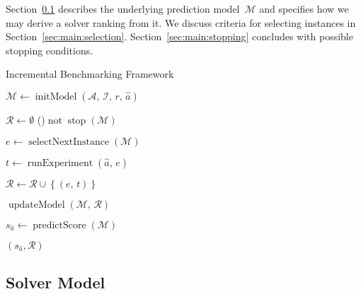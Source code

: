 \documentclass[runningheads]{llncs}
\begin{document}
Section~\ref{sec:main:model} describes the underlying prediction model~$\mathcal{M}$ and specifies how we may derive a solver ranking from it.
We discuss criteria for selecting instances in Section~\ref{sec:main:selection}.
Section~\ref{sec:main:stopping} concludes with possible stopping conditions.

\begin{algorithm}
  \caption{Incremental Benchmarking Framework}
  \label{algALBenchmark}


  \BlankLine

  $\mathcal{M} \leftarrow \operatorname{initModel}\left(\mathcal{A},\, \mathcal{I},\, r,\, \hat{a}\right)$ 
  
  \BlankLine
  $\mathcal{R} \leftarrow \emptyset$ \;
  \While(){$\operatorname{not} \operatorname{stop}\left(\mathcal{M}\right)$}{
    $e \leftarrow \operatorname{selectNextInstance}\left(\mathcal{M}\right)$ 

    $t \leftarrow \operatorname{runExperiment}\left(\hat{a},\,  e\right)$  

    $\mathcal{R} \leftarrow \mathcal{R} \cup \left\lbrace (e,\, t) \right\rbrace$

    \BlankLine
    $\operatorname{updateModel}\left(\mathcal{M},\, \mathcal{R}\right)$ 
  }
  $s_{\hat a} \leftarrow \operatorname{predictScore}(\mathcal{M})$ 
  
  \BlankLine
  \Return $(s_{\hat a}, \mathcal{R})$
\end{algorithm}


\subsection{Solver Model}
\label{sec:main:model}
\end{document}
